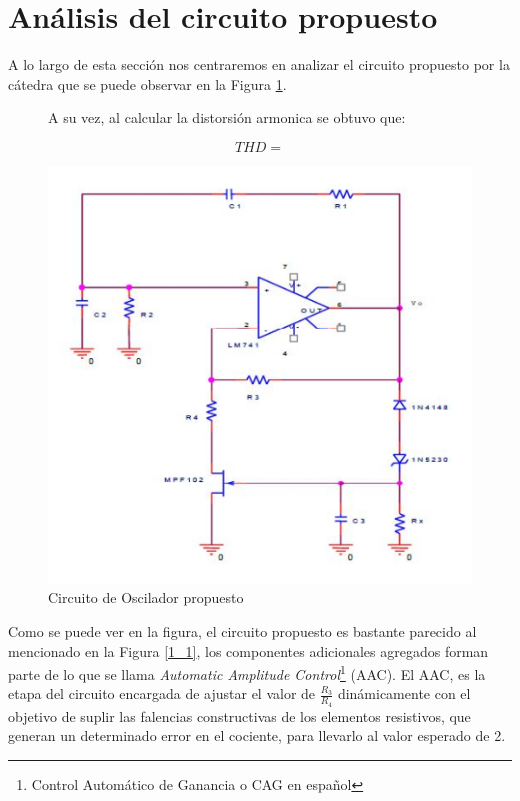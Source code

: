 \section{Análisis del circuito propuesto}

A lo largo de esta sección nos centraremos en analizar el circuito
propuesto por la cátedra que se puede observar en la Figura \ref{1_3}.

\begin{figure}[H]
\begin{centering}
A su vez, al calcular la distorsión armonica se obtuvo que:
\par\end{centering}
\[
THD=
\]
\begin{centering}
\includegraphics[scale=0.7]{../Ex1/Resources/Circuito}
\par\end{centering}
\caption{Circuito de Oscilador propuesto}
\label{1_3}

\end{figure}

Como se puede ver en la figura, el circuito propuesto es bastante
parecido al mencionado en la Figura \ref{1_1}, los componentes adicionales
agregados forman parte de lo que se llama \emph{Automatic Amplitude
Control}\footnote{Control Automático de Ganancia o CAG en español}
(AAC). El AAC, es la etapa del circuito encargada de ajustar el valor
de $\frac{R_{3}}{R_{4}}$ dinámicamente con el objetivo de suplir
las falencias constructivas de los elementos resistivos, que generan
un determinado error en el cociente, para llevarlo al valor esperado
de 2.

